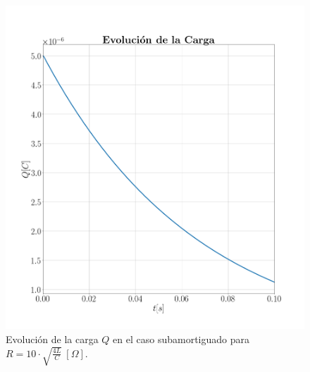 \documentclass[journal]{IEEEtran}
\begin{document}
\begin{figure}[!htb]
    \centering
    \includegraphics[width=\linewidth,trim={70 70 70 70},clip]{cargasobreamortiguado.png}
    \caption{Evolución de la carga $Q$ en el caso subamortiguado para $R=10 \cdot\sqrt{\frac{4L}{C}}~[\Omega]$.}
    \label{fig:cargasobreamortiguado}
\end{figure}
\end{document}
